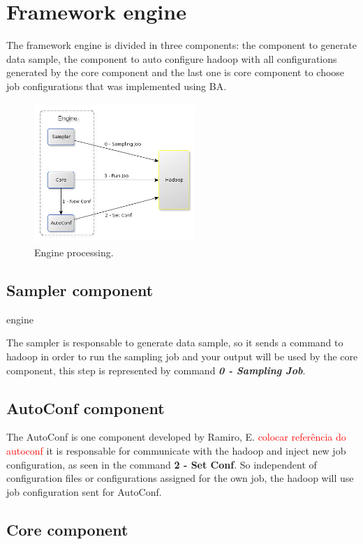 \section{Framework engine}

The framework engine is divided in three components: the component to generate
data sample, the component to auto configure hadoop with all configurations generated
by the core component and the last one is core component to choose job configurations
that was implemented using BA.

\begin{figure}[htbp]
	\centering
	\includegraphics[width=230px,height=200px]{img/engine.png}
	\caption{Engine processing.}\label{fig:engine}
\end{figure}

\subsection{Sampler component}engine

The sampler is responsable to generate data sample, so it sends a command to hadoop
in order to run the sampling job and your output will be used by the core component,
this step is represented by command {\it \bf 0 - Sampling Job}.

\subsection{AutoConf component}

The AutoConf is one component developed by Ramiro, E. \textcolor{red}{colocar referência do autoconf}
it is responsable for communicate with the hadoop and inject new job configuration,
as seen in the command {\bf 2 - Set Conf}. So independent of configuration files
or configurations assigned for the own job, the hadoop will use job configuration
sent for AutoConf.

\subsection{Core component}

